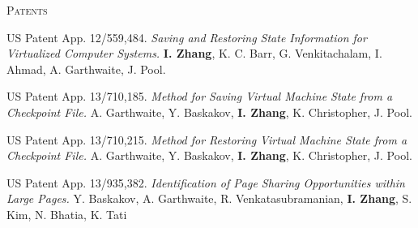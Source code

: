 \documentclass[10pt,times]{report}
\newlength{\sectiongap}
\newlength{\sectioncolwidth}
\newlength{\colgap}
\newlength{\stuffwidth}
\newenvironment{rtable}{
  \begin{minipage}{\textwidth}
  }{
  \end{minipage}
}
\newenvironment{rsection}[1]{
  \begin{minipage}[t]{\sectioncolwidth}
    \textsc{#1}
  \end{minipage}
  \hspace{\colgap}
  \begin{minipage}[t]{\stuffwidth}
  }{
    \removelastskip
  \end{minipage}
  \\[\sectiongap]
}
\begin{document}
\begin{rtable}
    \begin{rsection}{Patents}
    US Patent App. 12/559,484.
    \textit{Saving and Restoring State Information for Virtualized
      Computer Systems.} 
    \textbf{I. Zhang}, K. C. Barr, G. Venkitachalam, I. Ahmad, A. Garthwaite, J. Pool.\\\vspace{-0.7em}

    US Patent App. 13/710,185. 
    \textit{Method for Saving Virtual Machine State from a Checkpoint
    File.}  A. Garthwaite, Y. Baskakov, \textbf{I. Zhang}, K. Christopher,
    J. Pool.\\\vspace{-0.7em}

    US Patent App. 13/710,215. \textit{Method for Restoring Virtual Machine State from a Checkpoint
    File.} A. Garthwaite, Y. Baskakov, \textbf{I. Zhang}, K. Christopher,
    J. Pool.\\\vspace{-0.7em}
    
    US Patent App. 13/935,382. \textit{Identification of Page Sharing Opportunities within Large Pages.} Y. Baskakov, A. Garthwaite, R. Venkatasubramanian, \textbf{I. Zhang}, S. Kim, N. Bhatia, K. Tati\\
  \end{rsection}

\end{rtable}
\end{document}
